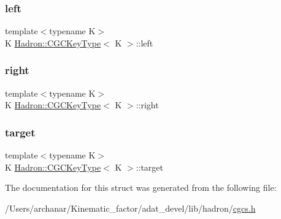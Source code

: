 \subsubsection{\texorpdfstring{left}{left}}
{\footnotesize\ttfamily template$<$typename K$>$ \\
K \mbox{\hyperlink{structHadron_1_1CGCKeyType}{Hadron\+::\+C\+G\+C\+Key\+Type}}$<$ K $>$\+::left}

\mbox{\label{structHadron_1_1CGCKeyType_a4d75dc8807294fd99260f8ac1baedee3}} 
\subsubsection{\texorpdfstring{right}{right}}
{\footnotesize\ttfamily template$<$typename K$>$ \\
K \mbox{\hyperlink{structHadron_1_1CGCKeyType}{Hadron\+::\+C\+G\+C\+Key\+Type}}$<$ K $>$\+::right}

\mbox{\label{structHadron_1_1CGCKeyType_a6e142be2aca9c37be703a19a06c31700}} 
\subsubsection{\texorpdfstring{target}{target}}
{\footnotesize\ttfamily template$<$typename K$>$ \\
K \mbox{\hyperlink{structHadron_1_1CGCKeyType}{Hadron\+::\+C\+G\+C\+Key\+Type}}$<$ K $>$\+::target}



The documentation for this struct was generated from the following file\+:\begin{DoxyCompactItemize}
\item 
/\+Users/archanar/\+Kinematic\+\_\+factor/adat\+\_\+devel/lib/hadron/\mbox{\hyperlink{lib_2hadron_2cgcs_8h}{cgcs.\+h}}\end{DoxyCompactItemize}
